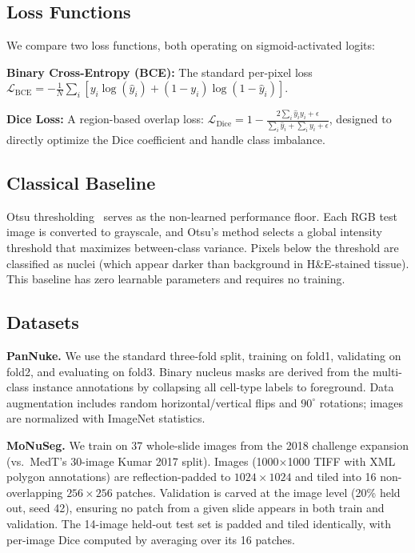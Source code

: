 \documentclass{article}
\begin{document}
\subsection{Loss Functions}

We compare two loss functions, both operating on sigmoid-activated logits:

\textbf{Binary Cross-Entropy (BCE):} The standard per-pixel loss $\mathcal{L}_{\text{BCE}} = -\frac{1}{N}\sum_i [y_i \log(\hat{y}_i) + (1-y_i)\log(1-\hat{y}_i)]$.

\textbf{Dice Loss:} A region-based overlap loss: $\mathcal{L}_{\text{Dice}} = 1 - \frac{2\sum_i \hat{y}_i y_i + \epsilon}{\sum_i \hat{y}_i + \sum_i y_i + \epsilon}$, designed to directly optimize the Dice coefficient and handle class imbalance.

\subsection{Classical Baseline}

Otsu thresholding~\cite{otsu1979threshold} serves as the non-learned performance floor. Each RGB test image is converted to grayscale, and Otsu's method selects a global intensity threshold that maximizes between-class variance. Pixels below the threshold are classified as nuclei (which appear darker than background in H\&E-stained tissue). This baseline has zero learnable parameters and requires no training.

\subsection{Datasets}

\textbf{PanNuke.} We use the standard three-fold split, training on fold1, validating on fold2, and evaluating on fold3. Binary nucleus masks are derived from the multi-class instance annotations by collapsing all cell-type labels to foreground. Data augmentation includes random horizontal/vertical flips and $90^\circ$ rotations; images are normalized with ImageNet statistics.

\textbf{MoNuSeg.} We train on 37 whole-slide images from the 2018 challenge expansion (vs.\ MedT's 30-image Kumar 2017 split). Images (1000$\times$1000 TIFF with XML polygon annotations) are reflection-padded to $1024\times1024$ and tiled into 16 non-overlapping $256\times256$ patches. Validation is carved at the image level (20\% held out, seed 42), ensuring no patch from a given slide appears in both train and validation. The 14-image held-out test set is padded and tiled identically, with per-image Dice computed by averaging over its 16 patches.
\end{document}
